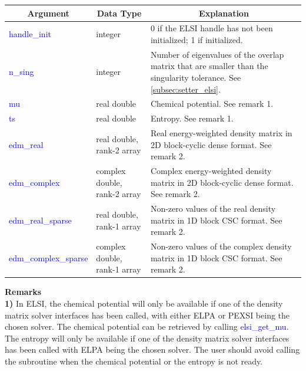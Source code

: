\documentclass{report}
\begin{document}
\begin{tabular}[]{|p{30mm}|p{45mm}|p{90mm}|}
\hline
\multicolumn{1}{|c|}{\textbf{Argument}} & \multicolumn{1}{c|}{\textbf{Data Type}} & \multicolumn{1}{c|}{\textbf{Explanation}}\\
\hline
\textcolor{blue}{handle\_init}         & integer                      & 0 if the ELSI handle has not been initialized; 1 if initialized.\\
\hline
\textcolor{blue}{n\_sing}              & integer                      & Number of eigenvalues of the overlap matrix that are smaller than the singularity tolerance.  See \ref{subsec:setter_elsi}.\\
\hline
\textcolor{blue}{mu}                   & real double                  & Chemical potential.  See remark 1.\\
\hline
\textcolor{blue}{ts}                   & real double                  & Entropy.  See remark 1.\\
\hline
\textcolor{blue}{edm\_real}            & real double, rank-2 array    & Real energy-weighted density matrix in 2D block-cyclic dense format.  See remark 2.\\
\hline
\textcolor{blue}{edm\_complex}         & complex double, rank-2 array & Complex energy-weighted density matrix in 2D block-cyclic dense format.  See remark 2.\\
\hline
\textcolor{blue}{edm\_real\_sparse}    & real double, rank-1 array    & Non-zero values of the real density matrix in 1D block CSC format.  See remark 2.\\
\hline
\textcolor{blue}{edm\_complex\_sparse} & complex double, rank-1 array & Non-zero values of the complex density matrix in 1D block CSC format.  See remark 2.\\
\hline
\end{tabular}

\bigskip
\textbf{Remarks}\\

\textbf{1)} In ELSI, the chemical potential will only be available if one of the density matrix solver interfaces has been called, with either ELPA or PEXSI being the chosen solver.  The chemical potential can be retrieved by calling \textcolor{blue}{elsi\_get\_mu}.  The entropy will only be available if one of the density matrix solver interfaces has been called with ELPA being the chosen solver.  The user should avoid calling the subroutine when the chemical potential or the entropy is not ready.\\
\end{document}
